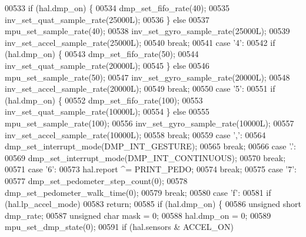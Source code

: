 \begin{DoxyCode}
00533         \textcolor{keywordflow}{if} (hal.dmp_on) \{
00534             dmp\_set\_fifo\_rate(40);
00535             inv\_set\_quat\_sample\_rate(25000L);
00536         \} \textcolor{keywordflow}{else}
00537             mpu\_set\_sample\_rate(40);
00538         inv\_set\_gyro\_sample\_rate(25000L);
00539         inv\_set\_accel\_sample\_rate(25000L);
00540         \textcolor{keywordflow}{break};
00541     \textcolor{keywordflow}{case} \textcolor{charliteral}{'4'}:
00542         \textcolor{keywordflow}{if} (hal.dmp_on) \{
00543             dmp\_set\_fifo\_rate(50);
00544             inv\_set\_quat\_sample\_rate(20000L);
00545         \} \textcolor{keywordflow}{else}
00546             mpu\_set\_sample\_rate(50);
00547         inv\_set\_gyro\_sample\_rate(20000L);
00548         inv\_set\_accel\_sample\_rate(20000L);
00549         \textcolor{keywordflow}{break};
00550     \textcolor{keywordflow}{case} \textcolor{charliteral}{'5'}:
00551         \textcolor{keywordflow}{if} (hal.dmp_on) \{
00552             dmp\_set\_fifo\_rate(100);
00553             inv\_set\_quat\_sample\_rate(10000L);
00554         \} \textcolor{keywordflow}{else}
00555             mpu\_set\_sample\_rate(100);
00556         inv\_set\_gyro\_sample\_rate(10000L);
00557         inv\_set\_accel\_sample\_rate(10000L);
00558         \textcolor{keywordflow}{break};
00559     \textcolor{keywordflow}{case} \textcolor{charliteral}{','}:
00564         dmp\_set\_interrupt\_mode(DMP\_INT\_GESTURE);
00565         \textcolor{keywordflow}{break};
00566     \textcolor{keywordflow}{case} \textcolor{charliteral}{'.'}:
00569         dmp\_set\_interrupt\_mode(DMP\_INT\_CONTINUOUS);
00570         \textcolor{keywordflow}{break};
00571     \textcolor{keywordflow}{case} \textcolor{charliteral}{'6'}:
00573         hal.report ^= PRINT_PEDO;
00574         \textcolor{keywordflow}{break};
00575     \textcolor{keywordflow}{case} \textcolor{charliteral}{'7'}:
00577         dmp\_set\_pedometer\_step\_count(0);
00578         dmp\_set\_pedometer\_walk\_time(0);
00579         \textcolor{keywordflow}{break};
00580     \textcolor{keywordflow}{case} \textcolor{charliteral}{'f'}:
00581         \textcolor{keywordflow}{if} (hal.lp_accel_mode)
00583             \textcolor{keywordflow}{return};
00585         \textcolor{keywordflow}{if} (hal.dmp_on) \{
00586             \textcolor{keywordtype}{unsigned} \textcolor{keywordtype}{short} dmp\_rate;
00587             \textcolor{keywordtype}{unsigned} \textcolor{keywordtype}{char} mask = 0;
00588             hal.dmp_on = 0;
00589             mpu\_set\_dmp\_state(0);
00591             \textcolor{keywordflow}{if} (hal.sensors & ACCEL_ON)

\end{DoxyCode}
